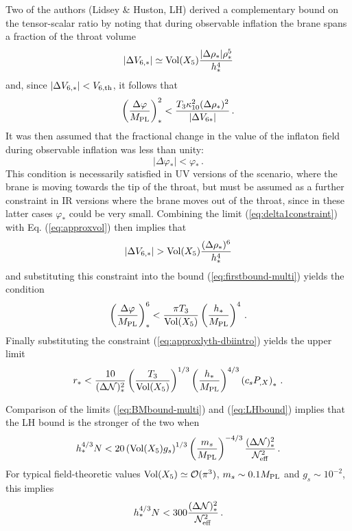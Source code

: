 Two of the authors (Lidsey \& Huston, LH) derived a complementary bound on the 
tensor-scalar ratio by noting that during observable inflation
the brane spans a fraction of the throat volume \cite{lidseyhuston}
% 
\begin{equation}
\label{eq:approxvol}
| \Delta V_{6,*} | \simeq \mathrm{Vol} (X_5) \frac{| \Delta \rho_*| \rho_*^5}{h_*^4}
\end{equation}
% 
and, since $| \Delta V_{6,*} |< 
V_{6,{\rm th}}$, it follows that
%  
\begin{equation}
\label{eq:firstbound-multi}
\left(\frac{\Delta \varphi}{M_{\mathrm{PL}}}\right)^2_* < \frac{T_3 \kappa_{10}^2
(\Delta \rho_*)^2}{| \Delta V_{6*}|} \,.
\end{equation}
% 
It was then assumed that the fractional change in the value of the 
inflaton field during observable inflation was less than unity:
% 
\begin{equation}
\label{eq:delta1constraint}
|\Delta \varphi_* | <  \varphi_* \,.
\end{equation}
%  
This condition is necessarily satisfied in UV
versions of the scenario, 
where the brane is moving towards the tip of the throat, but must be 
assumed as a further constraint in IR versions 
where the brane moves out of the throat, since in these latter cases
$\varphi_*$ could be very small. Combining the limit 
(\ref{eq:delta1constraint}) with Eq. (\ref{eq:approxvol}) then implies that
%  
\begin{equation}
| \Delta V_{6,*} | > \mathrm{Vol} (X_5) \frac{( \Delta \rho_* )^6}{h_*^4}
\end{equation}
% 
and substituting this constraint into the bound (\ref{eq:firstbound-multi}) yields 
the condition
%  
\begin{equation}
\left( \frac{\Delta \varphi}{M_{\mathrm{PL}}} \right)_*^6 < \frac{\pi T_3}{\mathrm{Vol} (X_5)} 
\left( \frac{h_*}{M_{\mathrm{PL}}} \right)^4 \,.
\end{equation}
% 
Finally substituting the constraint (\ref{eq:approxlyth-dbiintro}) 
yields the upper limit \cite{lidseyhuston}
% 
\begin{equation}
\label{eq:LHbound}
r_* < \frac{10}{(\Delta {\cal{N}})_*^2} \left( \frac{T_3}{\mathrm{Vol} (X_5)} \right)^{1/3} 
\left( \frac{h_*}{M_{\mathrm{PL}}} \right)^{4/3} \left( c_s P_{,X} \right)_* \,.
\end{equation}
% 


Comparison of the limits (\ref{eq:BMbound-multi}) and (\ref{eq:LHbound})
implies that the LH bound is the stronger of the two when
% 
\begin{equation}
\label{eq:LHstronger}
h_*^{4/3}N < 20 \left( \mathrm{Vol} (X_5) g_s \right)^{1/3}  
\left( \frac{m_s}{M_{\mathrm{PL}}} \right)^{-4/3} 
\frac{( \Delta {\cal{N}} )_*^2}{{\cal{N}}^2_{\rm eff}} \,.
\end{equation}
% 
For typical field-theoretic values $\mathrm{Vol} (X_5) \simeq \mathcal{O}(\pi^3)$, $m_s \sim
0.1 M_{\mathrm{PL}}$ 
and  $g_s \sim 10^{-2}$, this implies
%  
\begin{equation}
\label{eq:LHstronger1}
h_*^{4/3} N < 300 \frac{(\Delta {\cal{N}})^2_*}{{\cal{N}}_{\rm eff}^2} \,.
\end{equation}
% 


